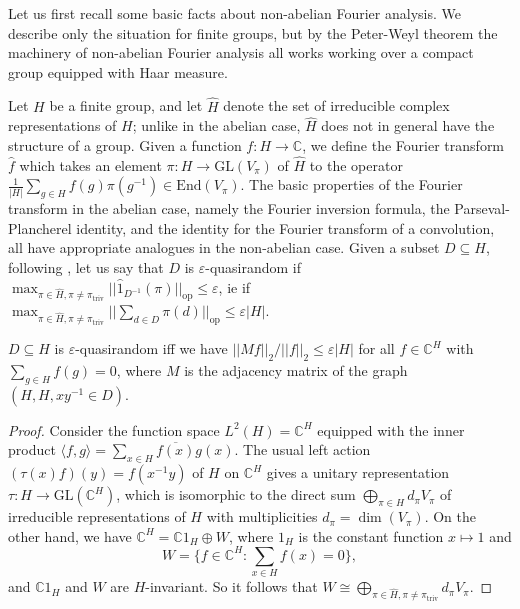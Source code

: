 \documentclass[10pt]{article}
\begin{document}
{Let us first recall some basic facts about non-abelian Fourier analysis. We describe only the situation for finite groups, but by the Peter-Weyl theorem the machinery of non-abelian Fourier analysis all works working over a compact group equipped with Haar measure.

Let $H$ be a finite group, and let $\widehat{H}$ denote the set of irreducible complex representations of $H$; unlike in the abelian case, $\widehat{H}$ does not in general have the structure of a group. Given a function $f:H\to\mathbb{C}$, we define the Fourier transform $\widehat{f}$ which takes an element $\pi:H\to\mathrm{GL}(V_\pi)$ of $\widehat{H}$ to the operator $\frac{1}{|H|}\sum_{g\in H}f(g)\pi(g^{-1})\in\mathrm{End}(V_\pi)$. The basic properties of the Fourier transform in the abelian case, namely the Fourier inversion formula, the Parseval-Plancherel identity, and the identity for the Fourier transform of a convolution, all have appropriate analogues in the non-abelian case. Given a subset $D\subseteq H$, following \cite{breuillard}, let us say that $D$ is $\varepsilon$-quasirandom if $\max_{\pi\in\widehat{H},\pi\neq\pi_{\mathrm{triv}}}||\widehat{1}_{D^{-1}}(\pi)||_{\mathrm{op}}\leqslant\varepsilon$, ie if $\max_{\pi\in\widehat{H},\pi\neq\pi_{\mathrm{triv}}}||\sum_{d\in D}\pi(d)||_{\mathrm{op}}\leqslant\varepsilon|H|$.

\begin{lemma}\label{qr_subsets_of_groups_1}
    $D\subseteq H$ is $\varepsilon$-quasirandom iff we have $||Mf||_2/||f||_2\leqslant\varepsilon|H|$ for all $f\in\mathbb{C}^H$ with $\sum_{g\in H}f(g)=0$, where $M$ is the adjacency matrix of the graph $(H,H,xy^{-1}\in D)$.
\end{lemma}
\begin{proof}


Consider the function space $L^2(H)=\mathbb{C}^H$ equipped with the inner product $\langle f,g\rangle=\sum_{x\in H}\overline{f(x)}g(x)$. The usual left action $(\tau(x)f)(y)=f(x^{-1}y)$ of $H$ on $\mathbb{C}^H$ gives a unitary representation $\tau:H\to\mathrm{GL}(\mathbb{C}^H)$, which is isomorphic to the direct sum $\bigoplus_{\pi\in \widehat{H}}d_\pi V_\pi$ of irreducible representations of $H$ with multiplicities $d_\pi=\dim(V_\pi)$. On the other hand, we have $\mathbb{C}^H=\mathbb{C}1_H\oplus W$, where $1_H$ is the constant function $x\mapsto 1$ and $$W=\{f\in\mathbb{C}^H:\sum_{x\in H}f(x)=0\},$$ and $\mathbb{C}1_H$ and $W$ are $H$-invariant. So it follows that $W\cong\bigoplus_{\pi\in\widehat{H},\pi\neq\pi_{\mathrm{triv}}}d_\pi V_\pi$.


\end{proof}}
\end{document}
